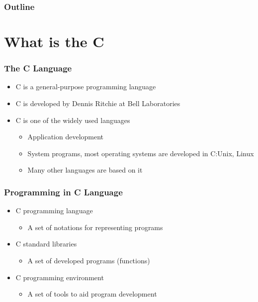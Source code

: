 \documentclass{../c-lecture}
\subtitle{C Programming Basics}
\begin{document}
\begin{frame}
  \titlepage{}
\end{frame}
\begin{frame}
  \frametitle{Outline}
  \tableofcontents{}
\end{frame}

\section{What is the C}

\begin{frame}
  \frametitle{The C Language}
  \begin{itemize}
    \item {\color{YellowOrange} C} is a
      {\color{YellowOrange} general-purpose} programming language
    \item {\color{LimeGreen}C} is developed by
      {\color{LimeGreen} Dennis Ritchie} at
      {\color{LimeGreen} Bell Laboratories}
    \item {\color{Orange} C} is one of the widely used languages
    \begin{itemize}
      \item Application development
      \item System programs, most operating systems are developed in C:\@ Unix, Linux
      \item Many other languages are based on it
    \end{itemize}
  \end{itemize}
\end{frame}

\begin{frame}
  \frametitle{Programming in C Language}
  \begin{itemize}
    \item C programming language
    \begin{itemize}
      \item A set of notations for representing programs
    \end{itemize}
    \item C standard libraries
    \begin{itemize}
      \item A set of developed programs (functions)
    \end{itemize}
    \item C programming environment
    \begin{itemize}
      \item A set of tools to aid program development
    \end{itemize}
  \end{itemize}
\end{frame}
\end{document}
